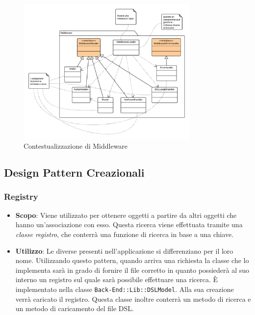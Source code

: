 \begin{figure}[H]

\centering \includegraphics[width=0.8\textwidth]{patterns/contestualizzazione/middleware.png}
\caption{Contestualizzazione di Middleware}
\label{fig:mvc}
\end{figure}

\subsection{Design Pattern Creazionali}

\subsubsection{Registry}

\begin{itemize}

	\item \textbf{Scopo}: Viene utilizzato per ottenere oggetti a partire da altri oggetti che hanno un'associazione con esso. Questa ricerca viene effettuata tramite una \textit{classe registro}, che conterrà una funzione di ricerca in base a una chiave.
	\item \textbf{Utilizzo}: Le diverse  presenti nell'applicazione si differenziano per il loro nome. Utilizzando questo pattern, quando arriva una richiesta la classe che lo implementa sarà in grado di fornire il file  corretto in quanto possiederà al suo interno un registro sul quale sarà possibile effettuare una ricerca. È implementato nella classe \texttt{Back-End::Lib::DSLModel}. Alla sua creazione verrà caricato il registro. Questa classe inoltre conterrà un metodo di ricerca e un metodo di caricamento del file DSL.

\end{itemize}

